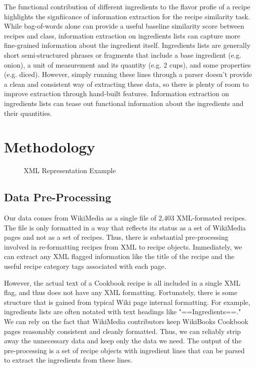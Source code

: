 \documentclass[11pt]{article}
\begin{document}
The functional contribution of different ingredients to the flavor profie of a recipe highlights the signfiicance of information extraction for the recipe similarity task.  While bag-of-words alone can provide a useful baseline similarity score between recipes and class, information extraction on ingredients lists can capture more fine-grained information about the ingredient itself. Ingredients lists are generally short semi-structured phrases or fragments that include a base ingredient (e.g. onion), a unit of measurement and its quantity (e.g. 2 cups), and some properties (e.g. diced). However, simply running these lines through a parser doesn't provide a clean and consistent way of extracting these data, so there is plenty of room to improve extraction through hand-built features. Information extraction on ingredients lists can tease out functional information about the ingredients and their quantities.

\section{Methodology}

\begin{figure*}
\centering
\lstset{basicstyle=\footnotesize, breaklines=true}

\caption[XML Representation Example]{XML Representation Example}
\label{fig:xml}
\end{figure*}

\subsection{Data Pre-Processing}
Our data comes from WikiMedia as a single file of 2,403 XML-formated recipes. The file is only formatted in a way that reflects its status as a set of WikiMedia pages and not as a set of recipes. Thus, there is substantial pre-processing involved in re-formatting recipes from XML to recipe objects. Immediately, we can extract any XML flagged information like the title of the recipe and the useful recipe category tags associated with each page. 

However, the actual text of a Cookbook recipe is all included in a single XML flag, and thus does not have any XML formatting. Fortunately, there is some structure that is gained from typical Wiki page internal formatting. For example, ingredients lists are often notated with text headings like "==Ingredients==." We can rely on the fact that WikiMedia contributors keep WikiBooks Cookbook pages reasonably consistent and cleanly formatted. Thus, we can reliably strip away the unnecessary data and keep only the data we need. The output of the pre-processing is a set of recipe objects with ingredient lines that can be parsed to extract the ingredients from these lines.
\end{document}
